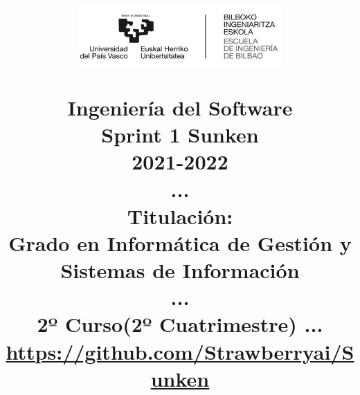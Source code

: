 \usepackage{graphicx} %
\usepackage{float}%
\graphicspath{ {images/} }

\title{%
    \begin{figure}[H]
        \centering
        \includegraphics[width=0.7\textwidth]{Logo_EHU.png}
    \end{figure}
  \textbf{Ingeniería del Software} \\
  \large{Sprint 1 Sunken \\
            2021-2022\\
            ...\\
            \textbf{Titulación:}\\
            Grado en Informática de Gestión y Sistemas de Información\\
            ...\\
            2º Curso(2º Cuatrimestre)
            ...\\
            \url{https://github.com/Strawberryai/Sunken}
    }
}